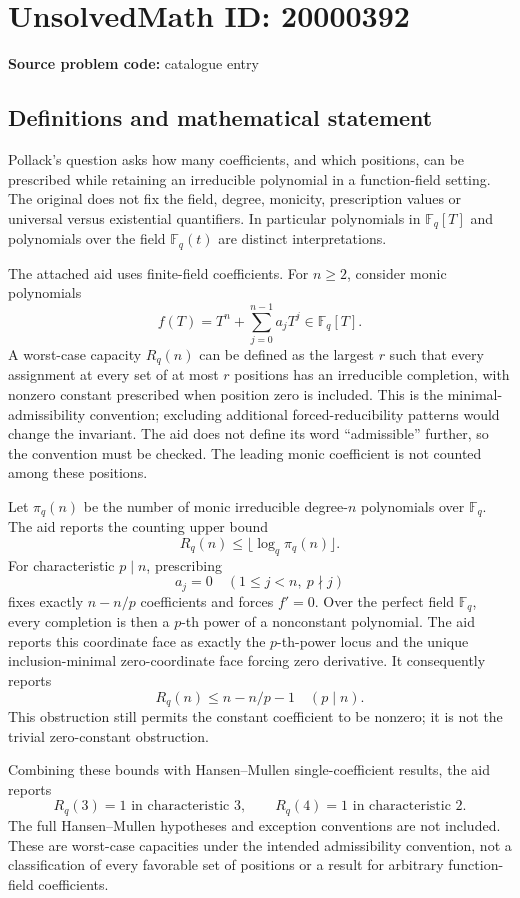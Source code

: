 \documentclass[11pt]{article}
\newcommand{\F}{\mathbb{F}}
\begin{document}
\section*{UnsolvedMath ID: 20000392}
\textbf{Source problem code:} catalogue entry
\subsection{Definitions and mathematical statement}
Pollack's question asks how many coefficients, and which positions, can be prescribed while retaining an irreducible polynomial in a function-field setting. The original does not fix the field, degree, monicity, prescription values or universal versus existential quantifiers. In particular polynomials in \(\F_q[T]\) and polynomials over the field \(\F_q(t)\) are distinct interpretations.

The attached aid uses finite-field coefficients. For \(n\geq2\), consider monic polynomials
\[
f(T)=T^n+\sum_{j=0}^{n-1}a_jT^j\in\F_q[T].
\]
A worst-case capacity \(R_q(n)\) can be defined as the largest \(r\) such that every assignment at every set of at most \(r\) positions has an irreducible completion, with nonzero constant prescribed when position zero is included. This is the minimal-admissibility convention; excluding additional forced-reducibility patterns would change the invariant. The aid does not define its word ``admissible'' further, so the convention must be checked. The leading monic coefficient is not counted among these positions.

Let \(\pi_q(n)\) be the number of monic irreducible degree-\(n\) polynomials over \(\F_q\). The aid reports the counting upper bound
\[
R_q(n)\leq\lfloor\log_q\pi_q(n)\rfloor.
\]
For characteristic \(p\mid n\), prescribing
\[
a_j=0\quad(1\leq j<n,\ p\nmid j)
\]
fixes exactly \(n-n/p\) coefficients and forces \(f'=0\). Over the perfect field \(\F_q\), every completion is then a \(p\)-th power of a nonconstant polynomial. The aid reports this coordinate face as exactly the \(p\)-th-power locus and the unique inclusion-minimal zero-coordinate face forcing zero derivative. It consequently reports
\[
R_q(n)\leq n-n/p-1\quad(p\mid n).
\]
This obstruction still permits the constant coefficient to be nonzero; it is not the trivial zero-constant obstruction.

Combining these bounds with Hansen--Mullen single-coefficient results, the aid reports
\[
R_q(3)=1\text{ in characteristic }3,\qquad
R_q(4)=1\text{ in characteristic }2.
\]
The full Hansen--Mullen hypotheses and exception conventions are not included. These are worst-case capacities under the intended admissibility convention, not a classification of every favorable set of positions or a result for arbitrary function-field coefficients.
\end{document}
